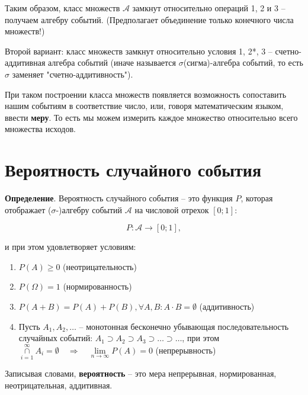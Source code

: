 \documentclass{article}
\begin{document}
Таким образом, класс множеств $\mathcal{A}$ замкнут относительно операций 1, 2 и 3 -- получаем алгебру событий. (Предполагает объединение только конечного числа множеств!)

Второй вариант: класс множеств замкнут относительно условия 1, 2*, 3 -- счетно-аддитивная алгебра событий (иначе называется $\sigma$(сигма)-алгебра событий, то есть $\sigma$ заменяет "счетно-аддитивность").

При таком построении класса множеств появляется возможность сопоставить нашим событиям в соответствие число, или, говоря математическим языком, ввести \textbf{меру}. То есть мы можем измерить каждое множество относительно всего множества исходов.

\section{Вероятность случайного события}

\textbf{Определение}. Вероятность случайного события -- это функция $P$, которая отображает \newline ($\sigma$-)алгебру событий $\mathcal{A}$ на числовой отрехок $[0; 1]$:

$$ P : \mathcal{A} \rightarrow [0; 1],$$

и при этом удовлетворяет условиям:

\begin{enumerate}
\item $ P(A) \geq 0 $ \qquad\qquad (неотрицательность)

\item $ P(\Omega) = 1$ \qquad\qquad (нормированность)

\item $ P(A + B) = P(A) + P(B), \forall A, B: A \cdot B = \emptyset $ \qquad\qquad (аддитивность)

\item Пусть $ A_1, A_2, \ldots $ -- монотонная бесконечно убывающая последовательность случайных событий: $ A_1 \supset A_2 \supset A_3 \supset \ldots \supset \ldots$, при этом
 $\cap\limits_{i = 1}^{\infty} A_i = \emptyset \quad \Rightarrow \quad
 \lim\limits_{n\rightarrow\infty}{P(A)} = 0$ \quad (непрерывность)

\end{enumerate}

Записывая словами, \textbf{вероятность} -- это мера непрерывная, нормированная, неотрицательная, аддитивная.

\quad
\end{document}

